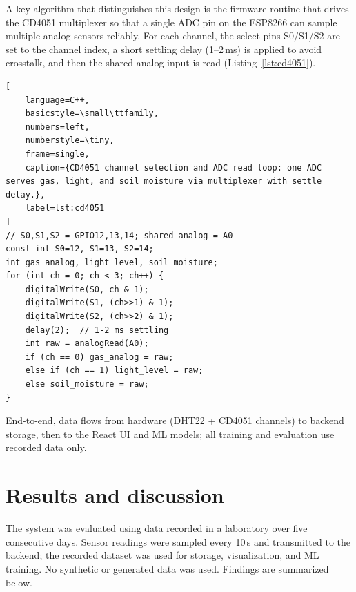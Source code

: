 \documentclass[journal,onecolumn]{IEEEtran}
\begin{document}
A key algorithm that distinguishes this design is the firmware routine that drives the CD4051 multiplexer so that a single ADC pin on the ESP8266 can sample multiple analog sensors reliably. For each channel, the select pins S0/S1/S2 are set to the channel index, a short settling delay (1--2\,ms) is applied to avoid crosstalk, and then the shared analog input is read (Listing~\ref{lst:cd4051}).
\begin{lstlisting}[
    language=C++,
    basicstyle=\small\ttfamily,
    numbers=left,
    numberstyle=\tiny,
    frame=single,
    caption={CD4051 channel selection and ADC read loop: one ADC serves gas, light, and soil moisture via multiplexer with settle delay.},
    label=lst:cd4051
]
// S0,S1,S2 = GPIO12,13,14; shared analog = A0
const int S0=12, S1=13, S2=14;
int gas_analog, light_level, soil_moisture;
for (int ch = 0; ch < 3; ch++) {
    digitalWrite(S0, ch & 1);
    digitalWrite(S1, (ch>>1) & 1);
    digitalWrite(S2, (ch>>2) & 1);
    delay(2);  // 1-2 ms settling
    int raw = analogRead(A0);
    if (ch == 0) gas_analog = raw;
    else if (ch == 1) light_level = raw;
    else soil_moisture = raw;
}
\end{lstlisting}

End-to-end, data flows from hardware (DHT22 + CD4051 channels) to backend storage, then to the React UI and ML models; all training and evaluation use recorded data only.

\section{Results and discussion}
The system was evaluated using data recorded in a laboratory over five consecutive days. Sensor readings were sampled every 10\,s and transmitted to the backend; the recorded dataset was used for storage, visualization, and ML training. No synthetic or generated data was used. Findings are summarized below.
\end{document}
